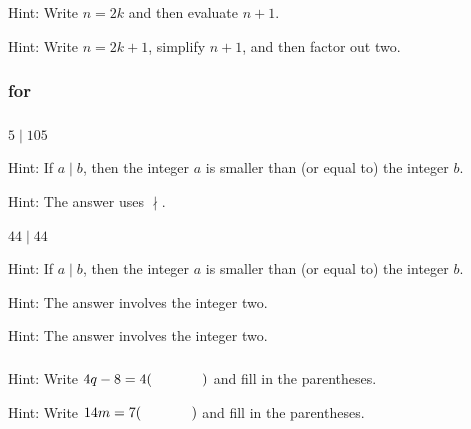\subsubsection*{ \answers}
\begin{apart}
    \item Hint: Write $n=2k$ and then evaluate $n+1$.
    \item Hint: Write $n=2k+1$, simplify $n+1$, and then factor out two.
\end{apart}


\subsubsection{\answers for  \subdivides}

\subsubsection*{ \answers}
\begin{apart}
    \item $5 \mid 105$
    \item Hint: If $a \mid b$, then the integer $a$ is smaller than (or equal to) the integer $b$.
    \item Hint: The answer uses $\nmid$.
    \item $44 \mid 44$
    \item Hint: If $a \mid b$, then the integer $a$ is smaller than (or equal to) the integer $b$.
    \item Hint: The answer involves the integer two.
    \item Hint: The answer involves the integer two.
\end{apart}

\subsubsection*{ \answers}
\begin{apart}
    \item Hint: Write $4q-8=4(\hspace{0.5in})$ and fill in the parentheses.
    \item Hint: Write $14m=7(\hspace{0.5in})$ and fill in the parentheses.
\end{apart}

